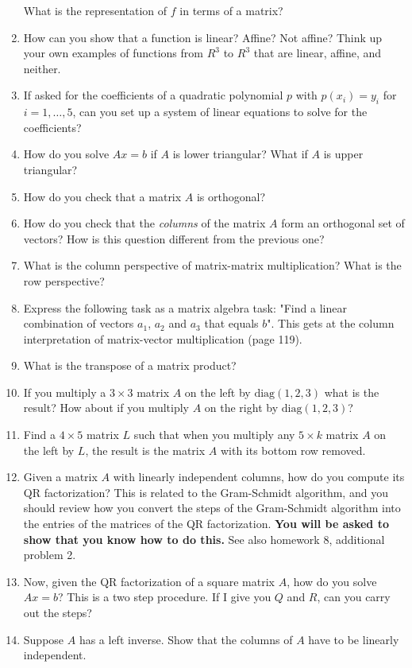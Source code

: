 \documentclass[11pt,fleqn]{article}
\begin{document}
\begin{enumerate}
What is the representation of $f$ in terms of a matrix?
\item How can you show that a function is linear? Affine? Not affine? Think up your own examples of functions from $R^3$ to $R^3$ that are linear, affine, and neither.
\item If asked for the coefficients of a quadratic polynomial $p$ with $p(x_i)=y_i$ for $i=1,\ldots, 5$,
can you set up a system of linear equations to solve for the coefficients?
\item How do you solve $Ax=b$ if $A$ is lower triangular?  What if $A$ is upper triangular?
	\item How do you check that a matrix $A$ is orthogonal?
	\item How do you check that the \emph{columns} of the matrix $A$ form an orthogonal set of vectors? How is this question different from the previous one? 
	\item What is the column perspective of matrix-matrix multiplication?  What is the row perspective?
	\item Express the following task as a matrix algebra task: "Find a linear combination of vectors $a_1$, $a_2$ and $a_3$
that equals $b$".  This gets at the column interpretation of matrix-vector multiplication (page 119).
	\item What is the transpose of a matrix product?
	\item If you multiply a $3\times 3$ matrix $A$ on the left by $\mathrm{diag}(1,2,3)$ what
is the result?  How about if you multiply $A$ on the right 
by $\mathrm{diag}(1,2,3)$?
	\item Find a $4\times 5$ matrix $L$ such that when you multiply any $5\times k$ matrix
$A$ on the left by $L$, the result is the matrix $A$ with its bottom row removed.
	\item Given a matrix $A$ with linearly independent columns,
how do you compute its QR factorization?  This is related to the Gram-Schmidt algorithm,
and you should review how you convert the steps of the Gram-Schmidt algorithm into
the entries of the matrices of the QR factorization. \textbf{You will be asked to show 
that you know how to do this.}  See also homework 8,
additional problem 2.
	\item Now, given the QR factorization of a square matrix $A$, how do you solve $Ax=b$?
This is a two step procedure.  If I give you $Q$ and $R$, can you carry out the steps?
	\item Suppose $A$ has a left inverse.  Show that the columns of $A$ have to be linearly independent.

\end{enumerate}
\end{document}
